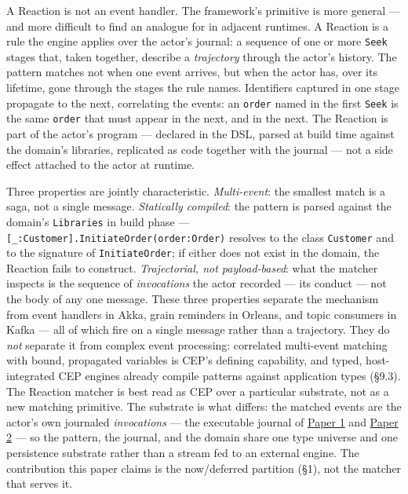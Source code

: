 \documentclass[
]{article}
\let\origtexttt\texttt%
\renewcommand{\texttt}[1]{\origtexttt{\seqsplit{#1}}}%
\let\texttt\origtexttt%
\begin{document}
A Reaction is not an event handler. The framework's primitive is more
general --- and more difficult to find an analogue for in adjacent
runtimes. A Reaction is a rule the engine applies over the actor's
journal: a sequence of one or more \texttt{Seek} stages that, taken
together, describe a \emph{trajectory} through the actor's history. The
pattern matches not when one event arrives, but when the actor has, over
its lifetime, gone through the stages the rule names. Identifiers
captured in one stage propagate to the next, correlating the events: an
\texttt{order} named in the first \texttt{Seek} is the same
\texttt{order} that must appear in the next, and in the next. The
Reaction is part of the actor's program --- declared in the DSL, parsed
at build time against the domain's libraries, replicated as code
together with the journal --- not a side effect attached to the actor at
runtime.

Three properties are jointly characteristic. \emph{Multi-event}: the
smallest match is a saga, not a single message. \emph{Statically
compiled}: the pattern is parsed against the domain's \texttt{Libraries}
in build phase --- \texttt{{[}\_:Customer{]}.InitiateOrder(order:Order)}
resolves to the class \texttt{Customer} and to the signature of
\texttt{InitiateOrder}; if either does not exist in the domain, the
Reaction fails to construct. \emph{Trajectorial, not payload-based}:
what the matcher inspects is the sequence of \emph{invocations} the
actor recorded --- its conduct --- not the body of any one message.
These three properties separate the mechanism from event handlers in
Akka, grain reminders in Orleans, and topic consumers in Kafka --- all
of which fire on a single message rather than a trajectory. They do
\emph{not} separate it from complex event processing: correlated
multi-event matching with bound, propagated variables is CEP's defining
capability, and typed, host-integrated CEP engines already compile
patterns against application types (§9.3). The Reaction matcher is best
read as CEP over a particular substrate, not as a new matching
primitive. The substrate is what differs: the matched events are the
actor's own journaled \emph{invocations} --- the executable journal of
\href{01-anti-porosity.md}{Paper 1} and
\href{02-program-value-separability.md}{Paper 2} --- so the pattern, the
journal, and the domain share one type universe and one persistence
substrate rather than a stream fed to an external engine. The
contribution this paper claims is the now/deferred partition (§1), not
the matcher that serves it.
\end{document}

